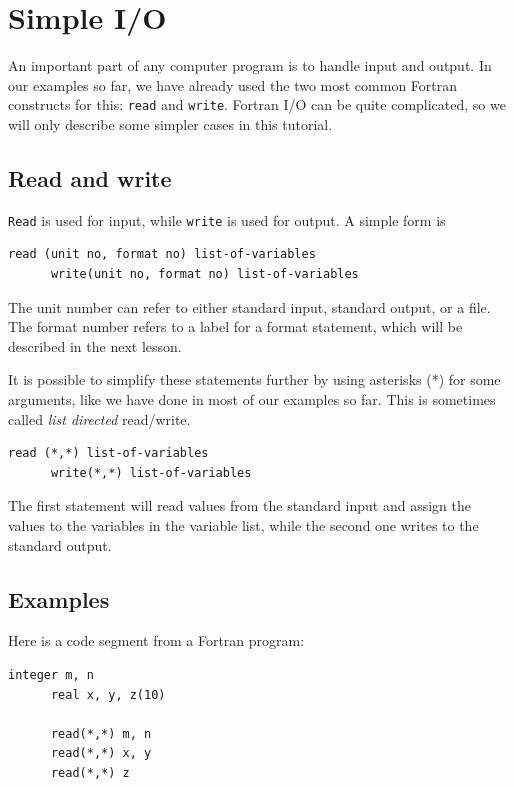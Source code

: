 \chapter{Simple I/O}

An important part of any computer program is to handle input and output. In our examples so far, we have already used the two most common Fortran constructs for this: \texttt{read} and \texttt{write}. Fortran I/O can be quite complicated, so we will only describe some simpler cases in this tutorial.

\section{Read and write}

\texttt{Read} is used for input, while \texttt{write} is used for output. A simple form is

\begin{lstlisting}[style=fortran77]
      read (unit no, format no) list-of-variables
      write(unit no, format no) list-of-variables
\end{lstlisting}

The unit number can refer to either standard input, standard output, or a file. The format number refers to a label for a format statement, which will be described in the next lesson.

It is possible to simplify these statements further by using asterisks (*) for some arguments, like we have done in most of our examples so far. This is sometimes called \emph{list directed} read/write.

\begin{lstlisting}[style=fortran77]
      read (*,*) list-of-variables
      write(*,*) list-of-variables
\end{lstlisting}

The first statement will read values from the standard input and assign the values to the variables in the variable list, while the second one writes to the standard output.

\section{Examples}

Here is a code segment from a Fortran program:

\begin{lstlisting}[style=fortran77]
      integer m, n
      real x, y, z(10)

      read(*,*) m, n 
      read(*,*) x, y
      read(*,*) z
\end{lstlisting}

